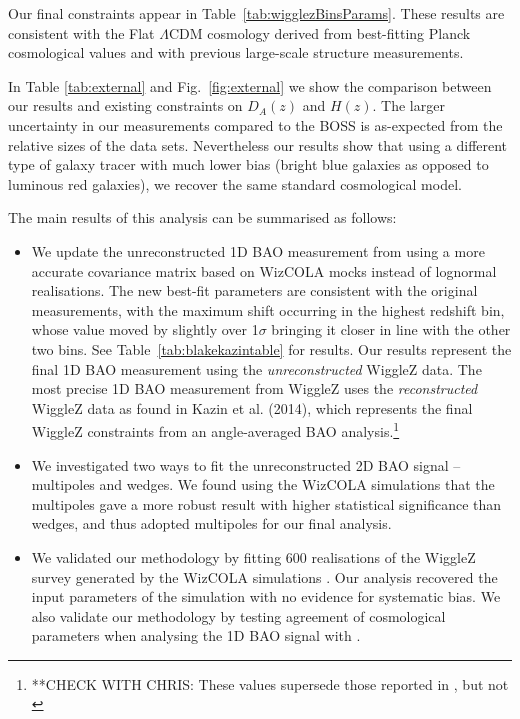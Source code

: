 \documentclass[iop,twocolappendix]{emulateapj}
\newcommand{\red}{\color{red}}
\begin{document}
Our final constraints appear in Table~\ref{tab:wigglezBinsParams}.  These results are consistent with the Flat $\Lambda$CDM cosmology derived from best-fitting Planck cosmological values and with previous large-scale structure measurements.

In Table \ref{tab:external} and Fig.~\ref{fig:external} we show the comparison between our results and existing constraints on $D_A(z)$ and $H(z)$.  The larger uncertainty in our measurements compared to the BOSS is as-expected from the relative sizes of the data sets.  Nevertheless our results show that using a different type of galaxy tracer with much lower bias (bright blue galaxies as opposed to luminous red galaxies), we recover the same standard cosmological model. 

The main results of this analysis can be summarised as follows:
\begin{itemize}
	\item We update the unreconstructed 1D BAO measurement from \citet{BlakeKazin2011} using a more accurate covariance matrix based on WizCOLA mocks instead of lognormal realisations. The new best-fit parameters are consistent with the original measurements, with the maximum shift occurring in the highest redshift bin, whose value moved by slightly over 1$\sigma$ bringing it closer in line with the other two bins. See Table~\ref{tab:blakekazintable} for results.  Our results represent the final 1D BAO measurement using the {\em unreconstructed} WiggleZ data.  The most precise 1D BAO measurement from WiggleZ uses the {\em reconstructed} WiggleZ data as found in Kazin et al. (2014), which represents the final WiggleZ constraints from an angle-averaged BAO analysis.\footnote{{\red **CHECK WITH CHRIS: These values supersede those reported in \citet{BlakeKazin2011}, but not \citet{KazinKoda2014}}}
	\item We investigated two ways to fit the unreconstructed 2D BAO signal -- multipoles and wedges.  We found using the WizCOLA simulations that the multipoles gave a more robust result with higher statistical significance than wedges, and thus adopted multipoles for our final analysis.
	\item We validated our methodology by fitting 600 realisations of the WiggleZ survey generated by the WizCOLA simulations \citep{KodaBlake2015}. Our analysis recovered the input parameters of the simulation with no evidence for systematic bias. We also validate our methodology by testing agreement of cosmological parameters when analysing the 1D BAO signal with  \citet{BlakeKazin2011}.

\end{itemize}
\end{document}
